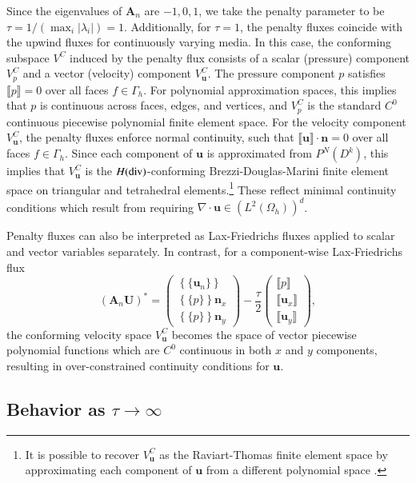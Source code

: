 \documentclass[preprint,10pt]{elsarticle}
\newcommand{\LRp}[1]{\left( #1 \right)}
\newcommand{\LRc}[1]{\left\{ #1 \right\}}
\newcommand{\Div} {\ensuremath{\nabla\cdot}}
\newcommand{\jump}[1] {\ensuremath{\llbracket#1\rrbracket}}
\newcommand{\avg}[1] {\ensuremath{\LRc{\!\{#1\}\!}}}
\newcommand{\Gh}{\Gamma_h}
\newcommand{\Oh}{\Omega_h}
\newcommand{\note}[1]{{\color{blue}#1}}
\begin{document}
Since the eigenvalues of $\bm{A}_n$ are $-1,0,1$, we take the penalty parameter to be $\tau = 1 / (\max_i |\lambda_i|) = 1$.   Additionally, for $\tau = 1$, the penalty fluxes coincide with the upwind fluxes for continuously varying media.  In this case, the conforming subspace $V^{C}$ induced by the penalty flux consists of a scalar (pressure) component $V^C_p$ and a vector (velocity) component $V^C_{\bm{u}}$.  The pressure component $p$ satisfies $\jump{p} = 0$ over all faces $f\in \Gh$.  For polynomial approximation spaces, this implies that $p$ is continuous across faces, edges, and vertices, and $V^C_p$ is the standard $C^0$ continuous piecewise polynomial finite element space.  For the velocity component $V_{\bm{u}}^C$, the penalty fluxes enforce normal continuity, such that $\jump{\bm{u}}\cdot \bm{n} = 0$ over all faces $f \in \Gh$.  Since each component of $\bm{u}$ is approximated from $P^N(D^k)$, this implies that $V^C_{\bm{u}}$ is the $H({\rm div})$-conforming Brezzi-Douglas-Marini finite element space \cite{brezzi1985two,boffi2013mixed} \note{on triangular and tetrahedral elements}.\footnote{It is possible to recover $V^C_{\bm{u}}$ as the Raviart-Thomas finite element space by approximating each component of $\bm{u}$ from a different polynomial space \cite{kirby2004algorithm}.}   These reflect minimal continuity conditions which result from requiring $\Div \bm{u} \in \LRp{L^2\LRp{\Oh}}^d$.

Penalty fluxes can also be interpreted as Lax-Friedrichs fluxes applied to scalar and vector variables separately.  In contrast, for a component-wise Lax-Friedrichs flux 
\[
(\bm{A}_n\bm{U})^* = \left(\begin{array}{c}
\avg{\bm{u}_n}\\
\avg{p }\bm{n}_x\\
\avg{p }\bm{n}_y
\end{array}
\right) - 
\frac{\tau}{2}\left(\begin{array}{c}
\jump{p}\\
\jump{\bm{u}_x}\\
\jump{\bm{u}_y}
\end{array}
\right),
\]
the conforming velocity space $V^C_{\bm{u}}$ becomes the space of vector piecewise polynomial functions which are $C^0$ continuous in both $x$ and $y$ components, resulting in over-constrained continuity conditions for $\bm{u}$.

\subsection{Behavior as $\tau\rightarrow\infty$}
\end{document}
